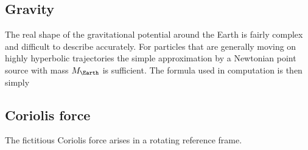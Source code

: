 %
%                
%                
%                
%                
%                
%                
%                
%
%



    \subsection{Gravity} \label{dfg}
        The real shape of the gravitational potential around the Earth is fairly complex and difficult to describe accurately.
        For particles that are generally moving on highly hyperbolic trajectories the
        simple approximation by a Newtonian point source with mass $M_\Earth$ is sufficient.
        The formula used in computation is then simply

    \subsection{Coriolis force} \label{dfC}
        The fictitious Coriolis force arises in a rotating reference frame.

